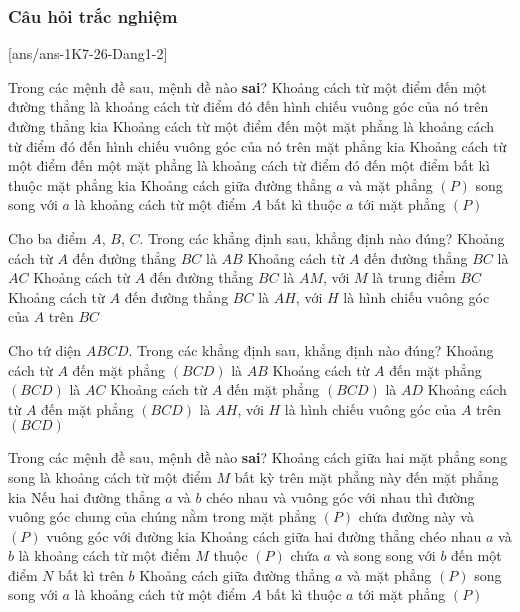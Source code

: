 \subsubsection{Câu hỏi trắc nghiệm}
[ans/ans-1K7-26-Dang1-2]
\begin{ex}%
	Trong các mệnh đề sau, mệnh đề nào \textbf{sai}?
	\choice
	{Khoảng cách từ một điểm đến một đường thẳng là khoảng cách từ điểm đó đến hình chiếu vuông góc của nó trên đường thẳng kia}
	{Khoảng cách từ một điểm đến một mặt phẳng là khoảng cách từ điểm đó đến hình chiếu vuông góc của nó trên mặt phẳng kia}
	{\True Khoảng cách từ một điểm đến một mặt phẳng là khoảng cách từ điểm đó đến một điểm bất kì thuộc mặt phẳng kia}
	{Khoảng cách giữa đường thẳng $a$ và mặt phẳng $(P)$ song song với $a$ là khoảng cách từ một điểm $A$ bất kì thuộc $a$ tới mặt phẳng $(P)$}
\end{ex}
\begin{ex}%
	Cho ba điểm $A$, $B$, $C$. Trong các khẳng định sau, khẳng định nào đúng?
	\choice
	{Khoảng cách từ $A$ đến đường thẳng $BC$ là $AB$}
	{Khoảng cách từ $A$ đến đường thẳng $BC$ là $AC$}
	{Khoảng cách từ $A$ đến đường thẳng $BC$ là $AM$, với $M$ là trung điểm $BC$}
	{\True Khoảng cách từ $A$ đến đường thẳng $BC$ là $AH$, với $H$ là hình chiếu vuông góc của $A$ trên $BC$}
\end{ex}
\begin{ex}%
	Cho tứ diện $ABCD$. Trong các khẳng định sau, khẳng định nào đúng?
	\choice
	{Khoảng cách từ $A$ đến mặt phẳng $(BCD)$ là $AB$}
	{Khoảng cách từ $A$ đến mặt phẳng $(BCD)$ là $AC$}
	{Khoảng cách từ $A$ đến mặt phẳng $(BCD)$ là $AD$}
	{\True Khoảng cách từ $A$ đến mặt phẳng $(BCD)$ là $AH$, với $H$ là hình chiếu vuông góc của $A$ trên $(BCD)$}
\end{ex}
\begin{ex}%
	Trong các mệnh đề sau, mệnh đề nào \textbf{sai}?
	\choice
	{\True Khoảng cách giữa hai mặt phẳng song song là khoảng cách từ một điểm $M$ bất kỳ trên mặt phẳng này đến mặt phẳng kia}
	{Nếu hai đường thẳng $a$ và $b$ chéo nhau và vuông góc với nhau thì đường vuông góc chung của chúng nằm trong mặt phẳng $(P)$ chứa đường này và $(P)$ vuông góc với đường kia}
	{Khoảng cách giữa hai đường thẳng chéo nhau $a$ và $b$ là khoảng cách từ một điểm $M$ thuộc $(P)$ chứa $a$ và song song với $b$ đến một điểm $N$ bất kì trên $b$}
	{Khoảng cách giữa đường thẳng $a$ và mặt phẳng $(P)$ song song với $a$ là khoảng cách từ một điểm $A$ bất kì thuộc $a$ tới mặt phẳng $(P)$}
\end{ex}
